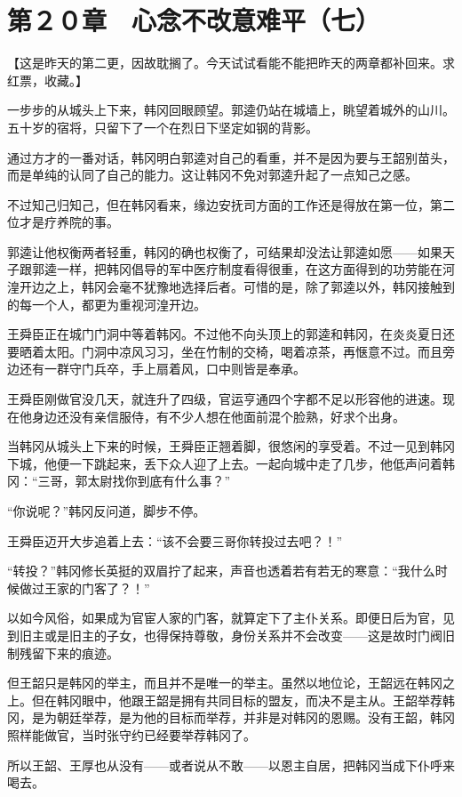 \section{第２０章　心念不改意难平（七）}

【这是昨天的第二更，因故耽搁了。今天试试看能不能把昨天的两章都补回来。求红票，收藏。】

一步步的从城头上下来，韩冈回眼顾望。郭逵仍站在城墙上，眺望着城外的山川。五十岁的宿将，只留下了一个在烈日下坚定如钢的背影。

通过方才的一番对话，韩冈明白郭逵对自己的看重，并不是因为要与王韶别苗头，而是单纯的认同了自己的能力。这让韩冈不免对郭逵升起了一点知己之感。

不过知己归知己，但在韩冈看来，缘边安抚司方面的工作还是得放在第一位，第二位才是疗养院的事。

郭逵让他权衡两者轻重，韩冈的确也权衡了，可结果却没法让郭逵如愿——如果天子跟郭逵一样，把韩冈倡导的军中医疗制度看得很重，在这方面得到的功劳能在河湟开边之上，韩冈会毫不犹豫地选择后者。可惜的是，除了郭逵以外，韩冈接触到的每一个人，都更为重视河湟开边。

王舜臣正在城门门洞中等着韩冈。不过他不向头顶上的郭逵和韩冈，在炎炎夏日还要晒着太阳。门洞中凉风习习，坐在竹制的交椅，喝着凉茶，再惬意不过。而且旁边还有一群守门兵卒，手上扇着风，口中则皆是奉承。

王舜臣刚做官没几天，就连升了四级，官运亨通四个字都不足以形容他的进速。现在他身边还没有亲信服侍，有不少人想在他面前混个脸熟，好求个出身。

当韩冈从城头上下来的时候，王舜臣正翘着脚，很悠闲的享受着。不过一见到韩冈下城，他便一下跳起来，丢下众人迎了上去。一起向城中走了几步，他低声问着韩冈：“三哥，郭太尉找你到底有什么事？”

“你说呢？”韩冈反问道，脚步不停。

王舜臣迈开大步追着上去：“该不会要三哥你转投过去吧？！”

“转投？”韩冈修长英挺的双眉拧了起来，声音也透着若有若无的寒意：“我什么时候做过王家的门客了？！”

以如今风俗，如果成为官宦人家的门客，就算定下了主仆关系。即便日后为官，见到旧主或是旧主的子女，也得保持尊敬，身份关系并不会改变——这是故时门阀旧制残留下来的痕迹。

但王韶只是韩冈的举主，而且并不是唯一的举主。虽然以地位论，王韶远在韩冈之上。但在韩冈眼中，他跟王韶是拥有共同目标的盟友，而决不是主从。王韶举荐韩冈，是为朝廷举荐，是为他的目标而举荐，并非是对韩冈的恩赐。没有王韶，韩冈照样能做官，当时张守约已经要举荐韩冈了。

所以王韶、王厚也从没有——或者说从不敢——以恩主自居，把韩冈当成下仆呼来喝去。

